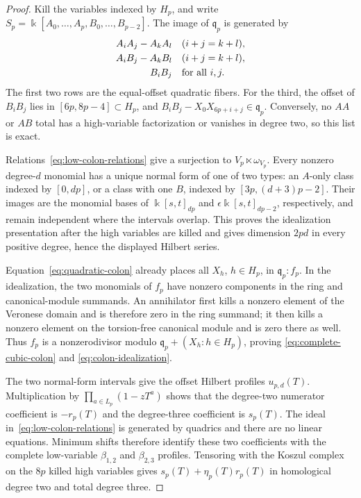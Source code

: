 \documentclass[11pt]{article}
\theoremstyle{definition}
\theoremstyle{remark}
\newcommand{\kfield}{\Bbbk}
\begin{document}
\begin{proof}
Kill the variables indexed by $H_p$, and write
$S_p=\kfield[A_0,\ldots,A_p,B_0,\ldots,B_{p-2}]$. The image of $\mathfrak q_p$ is generated by
\begin{equation}
\begin{split}
A_iA_j-A_kA_l&\quad(i+j=k+l),\\
A_iB_j-A_kB_l&\quad(i+j=k+l),\\
B_iB_j&\quad\hbox{for all }i,j.
\end{split}\label{eq:low-colon-relations}
\end{equation}
The first two rows are the equal-offset quadratic fibers. For the third, the offset of
$B_iB_j$ lies in $[6p,8p-4]\subset H_p$, and
$B_iB_j-X_0X_{6p+i+j}\in\mathfrak q_p$. Conversely, no $AA$ or $AB$ total has a
high-variable factorization or vanishes in degree two, so this list is exact.

Relations~\eqref{eq:low-colon-relations} give a surjection to $V_p\ltimes\omega_{V_p}$.
Every nonzero degree-$d$ monomial has a unique normal form of one of two types: an $A$-only
class indexed by $[0,dp]$, or a class with one $B$, indexed by
$[3p,(d+3)p-2]$. Their images are the monomial bases of
$\kfield[s,t]_{dp}$ and $\epsilon\kfield[s,t]_{dp-2}$, respectively, and remain independent
where the intervals overlap. This proves the idealization presentation after the high variables
are killed and gives dimension $2pd$ in every positive degree, hence the displayed Hilbert
series.

Equation~\eqref{eq:quadratic-colon} already places all $X_h$, $h\in H_p$, in
$\mathfrak q_p:f_p$. In the idealization, the two monomials of $f_p$ have nonzero components
in the ring and canonical-module summands. An annihilator first kills a nonzero element of the
Veronese domain and is therefore zero in the ring summand; it then kills a nonzero element on the
torsion-free canonical module and is zero there as well. Thus $f_p$ is a nonzerodivisor modulo
$\mathfrak q_p+(X_h:h\in H_p)$, proving \eqref{eq:complete-cubic-colon} and
\eqref{eq:colon-idealization}.

The two normal-form intervals give the offset Hilbert profiles $u_{p,d}(T)$. Multiplication by
$\prod_{a\in L_p}(1-zT^a)$ shows that the degree-two numerator coefficient is $-r_p(T)$ and
the degree-three coefficient is $s_p(T)$. The ideal in~\eqref{eq:low-colon-relations} is
generated by quadrics and there are no linear equations. Minimum shifts therefore identify these
two coefficients with the complete low-variable $\beta_{1,2}$ and $\beta_{2,3}$ profiles.
Tensoring with the Koszul complex on the $8p$ killed high variables gives
$s_p(T)+\eta_p(T)r_p(T)$ in homological degree two and total degree three.


\end{proof}
\end{document}
